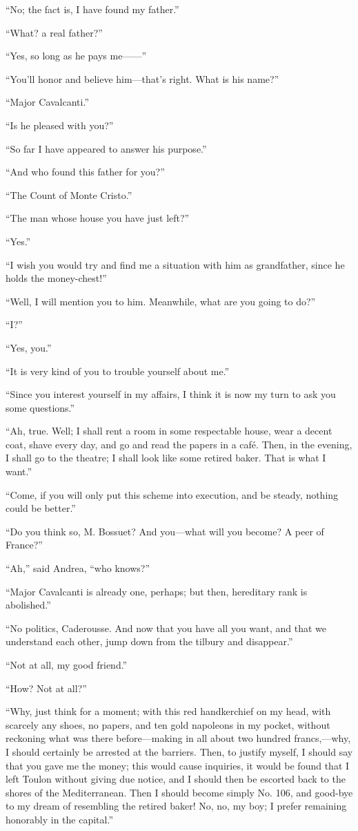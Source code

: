 “No; the fact is, I have found my father.”

“What? a real father?”

“Yes, so long as he pays me——”

“You’ll honor and believe him—that’s right. What is his name?”

“Major Cavalcanti.”

“Is he pleased with you?”

“So far I have appeared to answer his purpose.”

“And who found this father for you?”

“The Count of Monte Cristo.”

“The man whose house you have just left?”

“Yes.”

“I wish you would try and find me a situation with him as grandfather,
since he holds the money-chest!”

“Well, I will mention you to him. Meanwhile, what are you going to do?”

“I?”

“Yes, you.”

“It is very kind of you to trouble yourself about me.”

“Since you interest yourself in my affairs, I think it is now my turn
to ask you some questions.”

“Ah, true. Well; I shall rent a room in some respectable house, wear a
decent coat, shave every day, and go and read the papers in a café.
Then, in the evening, I shall go to the theatre; I shall look like some
retired baker. That is what I want.”

“Come, if you will only put this scheme into execution, and be steady,
nothing could be better.”

“Do you think so, M. Bossuet? And you—what will you become? A peer of
France?”

“Ah,” said Andrea, “who knows?”

“Major Cavalcanti is already one, perhaps; but then, hereditary rank is
abolished.”

“No politics, Caderousse. And now that you have all you want, and that
we understand each other, jump down from the tilbury and disappear.”

“Not at all, my good friend.”

“How? Not at all?”

“Why, just think for a moment; with this red handkerchief on my head,
with scarcely any shoes, no papers, and ten gold napoleons in my
pocket, without reckoning what was there before—making in all about two
hundred francs,—why, I should certainly be arrested at the barriers.
Then, to justify myself, I should say that you gave me the money; this
would cause inquiries, it would be found that I left Toulon without
giving due notice, and I should then be escorted back to the shores of
the Mediterranean. Then I should become simply No. 106, and good-bye to
my dream of resembling the retired baker! No, no, my boy; I prefer
remaining honorably in the capital.”

